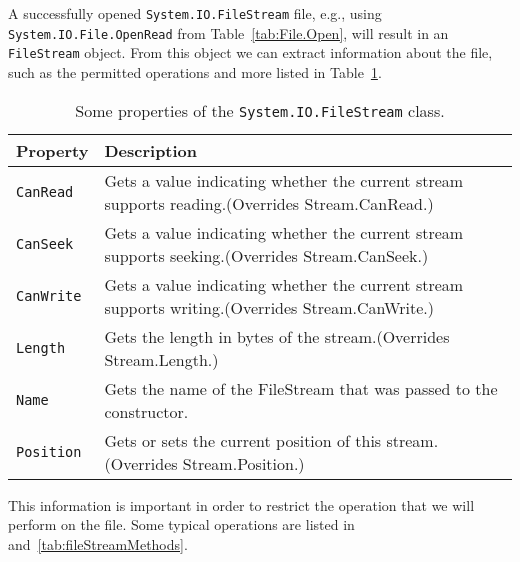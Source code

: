 A successfully opened \lstinline!System.IO.FileStream! file, e.g., using \lstinline!System.IO.File.OpenRead! from Table~\ref{tab:File.Open}, will result in an \lstinline!FileStream! object. From this object we can extract information about the file, such as the permitted operations and more listed in Table~\ref{tab:fileStreamProperties}.
\begin{table}
  \centering
  \begin{tabularx}{\linewidth}{|l|X|}
    \hline
    \rowcolor{headerRowColor} Property & Description\\
    \hline
    \lstinline{CanRead} & Gets a value indicating whether the current stream supports reading.(Overrides Stream.CanRead.)\\
    \hline
    \lstinline{CanSeek} & Gets a value indicating whether the current stream supports seeking.(Overrides Stream.CanSeek.)\\
    \hline
    \lstinline{CanWrite} & Gets a value indicating whether the current stream supports writing.(Overrides Stream.CanWrite.)\\
    \hline
    \lstinline{Length} & Gets the length in bytes of the stream.(Overrides Stream.Length.)\\
    \hline
    \lstinline{Name} & Gets the name of the FileStream that was passed to the constructor.\\
    \hline
    \lstinline{Position} & Gets or sets the current position of this stream.(Overrides Stream.Position.)\\
    \hline
  \end{tabularx}
  \caption{Some properties of the \lstinline!System.IO.FileStream! class.}
  \label{tab:fileStreamProperties}
\end{table}
This information is important in order to restrict the operation that we will perform on the file. Some typical operations are listed in and~\ref{tab:fileStreamMethods}.
